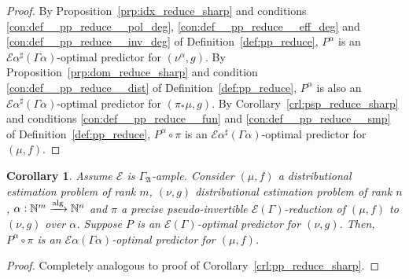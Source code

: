 \documentclass{article}
\numberwithin{equation}{section}
\theoremstyle{definition}
\theoremstyle{plain}
\newtheorem{corollary}{Corollary}[section]
\newcommand{\Nats}{\mathbb{N}}
\newcommand{\GrowA}{\Gamma_{\mathfrak{A}}}
\newcommand{\Fall}{\mathcal{E}}
\newcommand{\EG}{\Fall(\Gamma)}
\newcommand{\Alg}{\xrightarrow{\textnormal{alg}}}
\begin{document}
\begin{proof}

By Proposition~\ref{prp:idx_reduce_sharp} and conditions \ref{con:def__pp_reduce__pol_deg}, \ref{con:def__pp_reduce__eff_deg} and \ref{con:def__pp_reduce__inv_deg} of Definition~\ref{def:pp_reduce}, ${P^\alpha}$ is an ${\Fall \alpha^\sharp(\Gamma \alpha)}$-optimal predictor for ${(\nu^\alpha, g)}$. By Proposition~\ref{prp:dom_reduce_sharp} and condition \ref{con:def__pp_reduce__dist} of Definition~\ref{def:pp_reduce}, ${P^\alpha}$ is also an ${\Fall \alpha^\sharp(\Gamma \alpha)}$-optimal predictor for ${(\pi_* \mu, g)}$. By Corollary~\ref{crl:psp_reduce_sharp} and conditions \ref{con:def__pp_reduce__fun} and \ref{con:def__pp_reduce__smp} of Definition~\ref{def:pp_reduce}, ${P^\alpha \circ \pi}$ is an ${\Fall \alpha^\sharp(\Gamma \alpha)}$-optimal predictor for ${(\mu, f)}$.
%
\end{proof}

\begin{samepage}
\begin{corollary}

Assume ${\Fall}$ is ${\GrowA}$-ample. Consider $(\mu,f)$ a distributional estimation problem of rank ${m}$, $(\nu,g)$ distributional estimation problem of rank ${n}$, ${\alpha: \Nats^m \Alg \Nats^n}$ and $\pi$ a precise pseudo-invertible $\EG$-reduction of $(\mu, f)$ to $(\nu, g)$ over ${\alpha}$. Suppose $P$ is an $\EG$-optimal predictor for $(\nu, g)$. Then, $P^\alpha \circ \pi$ is an $\Fall \alpha (\Gamma \alpha)$-optimal predictor for $(\mu, f)$.

\end{corollary}
\end{samepage}

\begin{proof}

Completely analogous to proof of Corollary~\ref{crl:pp_reduce_sharp}.
%
\end{proof}
\end{document}
